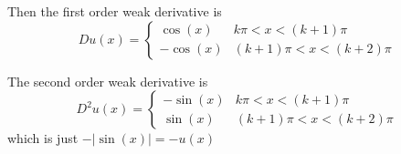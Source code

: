 \begin{enumerate}
  Then the first order weak derivative is
  $$
  Du(x) =
  \begin{cases}
    \cos(x) & k \pi < x < (k + 1) \pi\\
    -\cos(x) & (k + 1) \pi < x < (k + 2) \pi
  \end{cases}
  $$

  The second order weak derivative is
  $$
  D^2u(x) =
  \begin{cases}
    -\sin(x) & k \pi < x < (k + 1) \pi\\
    \sin(x) & (k + 1) \pi < x < (k + 2) \pi
  \end{cases}
  $$
  which is just $-|\sin(x)| = -u(x)$

\end{enumerate}

